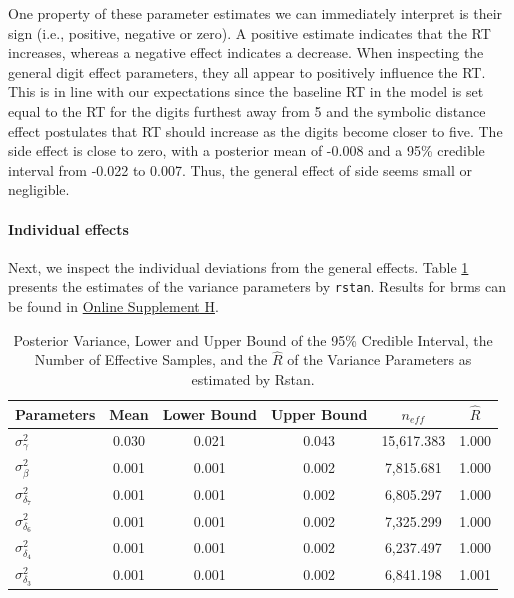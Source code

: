 \documentclass[
  english,
  doc,floatsintext]{apa6}
\let\oldparagraph\paragraph
\renewcommand{\paragraph}[1]{\oldparagraph{#1}\mbox{}}
\begin{document}
One property of these parameter estimates we can immediately interpret is their sign (i.e., positive, negative or zero). A positive estimate indicates that the RT increases, whereas a negative effect indicates a decrease. When inspecting the general digit effect parameters, they all appear to positively influence the RT. This is in line with our expectations since the baseline RT in the model is set equal to the RT for the digits furthest away from 5 and the symbolic distance effect postulates that RT should increase as the digits become closer to five. The side effect is close to zero, with a posterior mean of -0.008 and a 95\% credible interval from -0.022 to 0.007. Thus, the general effect of side seems small or negligible.

\hypertarget{individual-effects-1}{%
\paragraph{Individual effects}\label{individual-effects-1}}

Next, we inspect the individual deviations from the general effects. Table \ref{tab:inddevtablelog} presents the estimates of the variance parameters by \texttt{rstan}. Results for brms can be found in \href{https://github.com/MyrtheV/Bayesian-Hierarchical-Modelling-An-Introduction-and-Reassessment/blob/main/H\%20-\%20Posterior\%20Distributions\%20Tables/Online-Supplement-H---Tables-with-Information-on-Posterior-Distributions.pdf}{Online Supplement H}.

\begin{table}[h]

\begin{center}
\begin{threeparttable}

\caption{\label{tab:inddevtablelog}Posterior Variance, Lower and Upper Bound of the 95\% Credible Interval, the Number of Effective Samples, and the $\hat{R}$ of the Variance Parameters as estimated by Rstan.}

\begin{tabular}{lccccc}
\toprule
Parameters & \multicolumn{1}{c}{Mean} & \multicolumn{1}{c}{Lower Bound} & \multicolumn{1}{c}{Upper Bound} & \multicolumn{1}{c}{$n_{eff}$} & \multicolumn{1}{c}{$\hat{R}$}\\
\midrule
$\sigma_{\gamma}^2$ & 0.030 & 0.021 & 0.043 & 15,617.383 & 1.000\\
$\sigma_{\beta}^2$ & 0.001 & 0.001 & 0.002 & 7,815.681 & 1.000\\
$\sigma_{\delta_{7}}^2$ & 0.001 & 0.001 & 0.002 & 6,805.297 & 1.000\\
$\sigma_{\delta_{6}}^2$ & 0.001 & 0.001 & 0.002 & 7,325.299 & 1.000\\
$\sigma_{\delta_{4}}^2$ & 0.001 & 0.001 & 0.002 & 6,237.497 & 1.000\\
$\sigma_{\delta_{3}}^2$ & 0.001 & 0.001 & 0.002 & 6,841.198 & 1.001\\
\bottomrule
\end{tabular}

\end{threeparttable}
\end{center}

\end{table}
\end{document}
